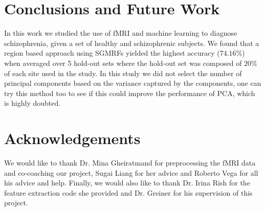 \documentclass{article} %
\begin{document}
\section{Conclusions and Future Work}
In this work we studied the use of fMRI and machine learning to diagnose
schizophrenia, given a set of healthy and schizophrenic subjects. We found
that a region based approach using SGMRFs yielded the highest accuracy 
($74.16\%$) when averaged over 5 hold-out sets where the hold-out set was
composed of $20\%$ of each site used in the study. In this study we did not select the number of principal components based on the variance captured by the components, one can try this method too to see if this could improve the performance of PCA, which is highly doubted. 

\section{Acknowledgements}
We would like to thank Dr. Mina Gheiratmand for preprocessing the fMRI data 
and co-coaching our project, Sugai Liang for her advice and Roberto Vega for
all his advice and help. Finally, we would also like to thank Dr. Irina Rish
for the feature extraction code she provided and Dr. Greiner for his
supervision of this project.




	
\end{document}
